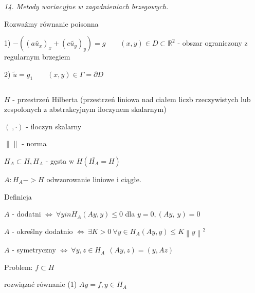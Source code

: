 \textit{14. Metody wariacyjne w zagadnieniach brzegowych.}

Rozważmy równanie poisonna

1) $-((a\tilde{u_x})_x + (c\tilde{u_y})_y) = g\ \ \ \ \ \ \ \ \ (x,y) \in D \subset \mathbb{R}^2$ - obszar ograniczony z regularnym brzegiem

2) $\tilde{u} = g_1\ \ \ \ \ \ \ \ \ (x,y) \in \Gamma = \partial D$

$\ $

$H$ - przestrzeń Hilberta (przestrzeń liniowa nad ciałem liczb rzeczywistych lub zespolonych z abstrakcyjnym iloczynem skalarnym)

$(\ ,\cdot)$ - iloczyn skalarny

$\left \|  \right \|$ - norma

$H_A \subset H, H_A$ - gęsta w $H (\bar{H_A} = H)$

$A: H_A -> H$ odwzorowanie liniowe i ciągłe.

Definicja

$A$ - dodatni $\Leftrightarrow\ \forall y in H_A (Ay,y) \leqslant 0$    dla $y = 0, (Ay,\ y) = 0$

$A$ - określny dodatnio $\Leftrightarrow\ \exists K > 0\ \forall y \in H_A (Ay,y) \leqslant K \left \| y \right \| ^ 2$

$A$ - symetryczny $\Leftrightarrow\ \forall y,z \in H_A\ \ (Ay,z) = (y,Az)$

Problem: $f \subset H$

    rozwiązać równanie (1) $Ay=f, y \in H_A$